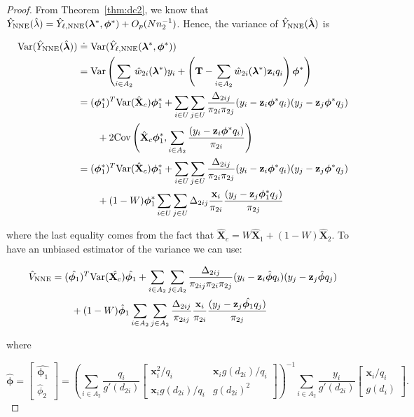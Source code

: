 \documentclass[12pt]{article}
\newcommand{\Cov}{{\text{Cov}}}
\newcommand{\Var}{{\text{Var}}}
\renewcommand{\bf}[1]{\mathbf{#1}}
\begin{document}
\begin{proof}
  From Theorem~\ref{thm:dc2}, we know that $\hat Y_{\rm NNE}(\hat \lambda) = 
  \hat Y_{\ell, \rm NNE}(\bm \lambda^*, \bm \phi^*) + O_p(Nn_2^{-1})$. Hence, the
  variance of $\hat Y_{\rm NNE}(\hat{\bm \lambda})$ is 

  \begin{align*}
    \Var(\hat Y_{\rm NNE}(\hat{\bm \lambda})) 
    &\doteq \Var(\hat Y_{\ell, \rm NNE}(\bm \lambda^*, \bm \phi^*)) \\ 
    &= \Var\left(\sum_{i \in A_2} \hat w_{2i}(\bm \lambda^*) y_i + 
      \left(\bf T - \sum_{i \in A_2} \hat w_{2i}(\bm \lambda^*) \bf z_i
    q_i\right)\bm \phi^*\right)\\
    &= (\bm \phi_1^*)^T \Var(\hat{\bf X}_c) \bm \phi_1^* + 
    \sum_{i \in U} \sum_{j \in U} \frac{\Delta_{2ij}}{\pi_{2i}\pi_{2j}} 
    (y_i - \bf z_i \bm \phi^* q_i)(y_j - \bf z_j \bm \phi^* q_j)\\
    &\qquad+ 2 \Cov\left(\hat{\bf X}_c \bm \phi_1^*, \sum_{i \in A_2} 
      \frac{(y_i - \bf z_i \bm \phi^* q_i)}{\pi_{2i}}\right) \\
    &= (\bm \phi_1^*)^T \Var(\hat{\bf X}_c) \bm \phi_1^* + 
    \sum_{i \in U} \sum_{j \in U} \frac{\Delta_{2ij}}{\pi_{2i}\pi_{2j}} 
    (y_i - \bf z_i \bm \phi^* q_i)(y_j - \bf z_j \bm \phi^* q_j)\\
    &\qquad + (1 - W)\bm \phi_1^* \sum_{i \in U} \sum_{j \in U} \Delta_{2ij} 
    \frac{\bf{x}_i}{\pi_{2i}} \frac{(y_j - \bf z_j \bm \phi^*_1 q_j)}{\pi_{2j}}\\
  \end{align*}

where the last equality comes from the fact that $\hat{\bf X}_c = W\hat{\bf
X}_1 + (1 - W) \hat{\bf X}_2$. To have an unbiased estimator of the variance
  we can use:

  \begin{align*}
    \hat V_{\rm NNE} 
    &= (\hat{\bm \phi_1})^T \Var(\hat{\bf X_c}) \hat{\bm \phi_1} + 
    \sum_{i \in A_2} \sum_{j \in A_2} \frac{\Delta_{2ij}}{\pi_{2ij}\pi_{2i}\pi_{2j}} 
    (y_i - \bf z_i \hat{\bm \phi} q_i)(y_j - \bf z_j \hat{\bm \phi} q_j) \\
    &\qquad + (1 - W)\hat{\bm \phi}_1 \sum_{i \in A_2} \sum_{j \in A_2} 
    \frac{\Delta_{2ij}}{\pi_{2ij}} \frac{\bf{x}_i}{\pi_{2i}} 
    \frac{(y_j - \bf z_j \hat{\bm \phi_1} q_j)}{\pi_{2j}}
  \end{align*}

  where 
  
  $$\hat{\bm \phi} =
  \begin{bmatrix}
    \hat{\bm \phi_1} \\ \hat \phi_2
  \end{bmatrix} = 
  \left(\sum_{i \in A_2} \frac{q_i}{g'(d_{2i})} 
  \begin{bmatrix}
    \bf x_i^2 / q_i & \bf x_i g(d_{2i}) / q_i \\
    \bf x_i g(d_{2i}) / q_i & g(d_{2i})^2
  \end{bmatrix}
  \right)^{-1}
  \sum_{i \in A_2} \frac{y_i}{g'(d_{2i})} 
  \begin{bmatrix} \bf x_i / q_i \\ g(d_i) \end{bmatrix}.
  $$


\end{proof}
\end{document}
